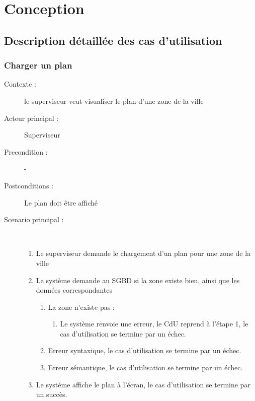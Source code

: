 \chapter{Conception}



\section{Description d\'etaill\'ee des cas d’utilisation}

\subsection{Charger un plan}
\begin{description}
    \item[Contexte :] le superviseur veut visualiser le plan d'une zone de la ville
    \item[Acteur principal :] Superviseur
    \item[Precondition :] -
    \item[Postconditions :] Le plan doit \^etre affich\'e
    \item[Scenario principal :] ~
    \begin{enumerate}
        \item Le superviseur demande le chargement d'un plan pour une zone de la ville
        \item Le syst\`eme demande au SGBD si la zone existe bien, ainsi que les donn\'ees correspondantes
        \begin{enumerate}
            \item La zone n'existe pas :
            \begin{enumerate}
                \item Le syst\`eme renvoie une erreur, le CdU reprend \`a l'\'etape 1, le cas d'utilisation se termine par un \'echec.
            \end{enumerate}
            \item Erreur syntaxique, le cas d'utilisation se termine par un \'echec.
            \item Erreur s\'emantique, le cas d'utilisation se termine par un \'echec.
        \end{enumerate}
        \item Le syst\'eme affiche le plan \`a l'\'ecran, le cas d'utilisation se termine par un succ\`es.
    \end{enumerate}
\end{description}
\pagebreak

